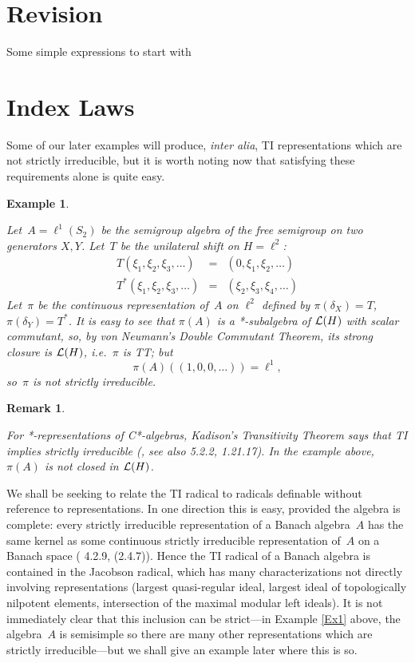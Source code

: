 \documentclass[11pt]{article}
\newcommand{\ie}{i.e.\ }
\newtheorem{example}[thm]{Example}
\newtheorem{remk}[thm]{Remark}
\newenvironment{Example}{\begin{example}\begin{rm}}{\end{rm}\end{example}}
\newenvironment{Remark}{\begin{remk}\begin{rm}}{\end{rm}\end{remk}}
\newcommand{\LH}{{\cal L}(H)}
\begin{document}
\section{Revision}\label{S2}

Some simple expressions to start with


\section{Index Laws}\label{S3}

Some of our later examples will produce, {\em inter alia}, TI representations
which are not strictly irreducible, but it is worth noting now that
satisfying these requirements alone is quite easy.

\begin{Example}\label{Ex1}
Let~$A= \ell^1(S_2)$ be the semigroup algebra of the free semigroup on two
generators $X,Y$.    Let~$T$ be the unilateral shift on $H=\ell^2$:
\begin{eqnarray*}
T(\xi_1,\xi_2,\xi_3,\dots) & = & (0,\xi_1,\xi_2,\dots)\\
T^*(\xi_1,\xi_2,\xi_3,\dots) & = & (\xi_2,\xi_3,\xi_4,\dots)
\end{eqnarray*}
Let~$\pi$ be the continuous representation of~$A$ on $\ell^2$ defined by
$\pi(\delta_X) = T$, $\pi(\delta_Y) = T^*$.   It is easy to see that
$\pi(A)$ is a *-subalgebra of $\LH$ with scalar commutant, so, by von Neumann's
Double Commutant Theorem, its strong closure is $\LH$, \ie $\pi$ is TT; but
$$\pi(A)((1,0,0,\dots))  = \ell^1,$$ so~$\pi$ is not strictly irreducible.
\end{Example}

\begin{Remark}
For *-representations of C*-algebras,
Kadison's Transitivity Theorem says that TI implies strictly irreducible
(\cite{Kadison}, see also \cite{Murphy} 5.2.2, \cite{Sakai} 1.21.17).  In
the example above, $\pi(A)$ is not closed in $\LH$.
\end{Remark}

We shall be seeking to relate the TI radical to radicals definable without
reference to representations.    In one direction this is easy, provided the
algebra is complete:  every strictly irreducible representation of a Banach algebra~$A$ has the
same kernel as some continuous strictly irreducible representation of~$A$ on a Banach
space (\cite{Palmerbk} 4.2.9, \cite{Rickart} (2.4.7)).    Hence the TI radical
of a Banach algebra is contained in the Jacobson radical, which has many
characterizations not directly involving representations (largest quasi-regular
ideal, largest ideal of topologically nilpotent elements, intersection of the
maximal modular left ideals).   It is not immediately clear
that this inclusion can be strict---in Example \ref{Ex1} above, the algebra~$A$
is semisimple so there are many other representations which are strictly
irreducible---but we shall give an example later where this is so.
\end{document}
